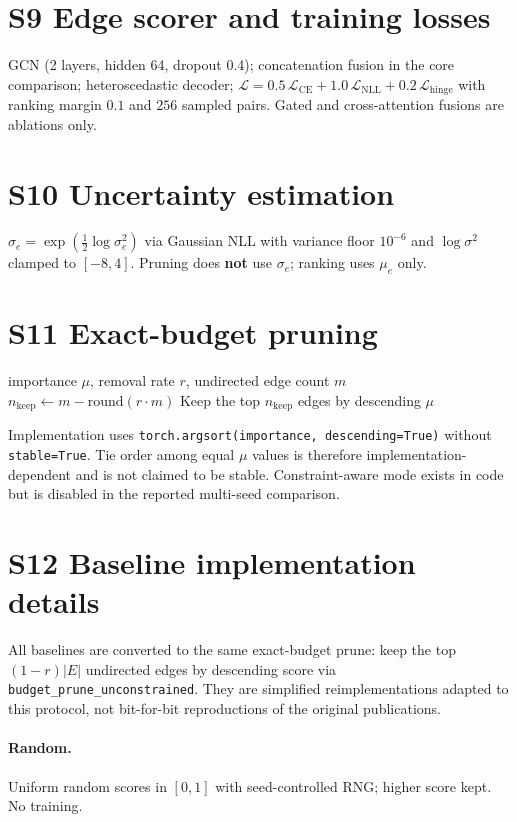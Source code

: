 \documentclass[11pt,a4paper]{article}
\begin{document}
\section{S9 Edge scorer and training losses}
GCN (2 layers, hidden 64, dropout 0.4); concatenation fusion in the core comparison; heteroscedastic decoder;
$\mathcal{L}=0.5\,\mathcal{L}_{\mathrm{CE}}+1.0\,\mathcal{L}_{\mathrm{NLL}}+0.2\,\mathcal{L}_{\mathrm{hinge}}$
with ranking margin $0.1$ and $256$ sampled pairs.
Gated and cross-attention fusions are ablations only.

\section{S10 Uncertainty estimation}
$\sigma_e=\exp(\tfrac12\log\sigma_e^2)$ via Gaussian NLL with variance floor $10^{-6}$ and $\log\sigma^2$ clamped to $[-8,4]$.
Pruning does \textbf{not} use $\sigma_e$; ranking uses $\mu_e$ only.

\section{S11 Exact-budget pruning}
\begin{algorithm}[H]
\caption{Unconstrained exact-budget prune (reported comparison)}
\begin{algorithmic}[1]
\Require importance $\mu$, removal rate $r$, undirected edge count $m$
\State $n_{\mathrm{keep}}\leftarrow m-\mathrm{round}(r\cdot m)$
\State Keep the top $n_{\mathrm{keep}}$ edges by descending $\mu$
\end{algorithmic}
\end{algorithm}
Implementation uses \texttt{torch.argsort(importance, descending=True)} without \texttt{stable=True}.
Tie order among equal $\mu$ values is therefore implementation-dependent and is not claimed to be stable.
Constraint-aware mode exists in code but is disabled in the reported multi-seed comparison.

\section{S12 Baseline implementation details}
All baselines are converted to the same exact-budget prune: keep the top $(1-r)|E|$ undirected edges by descending score via \texttt{budget\_prune\_unconstrained}.
They are simplified reimplementations adapted to this protocol, not bit-for-bit reproductions of the original publications.

\paragraph{Random.}
Uniform random scores in $[0,1]$ with seed-controlled RNG; higher score kept.
No training.
\end{document}
